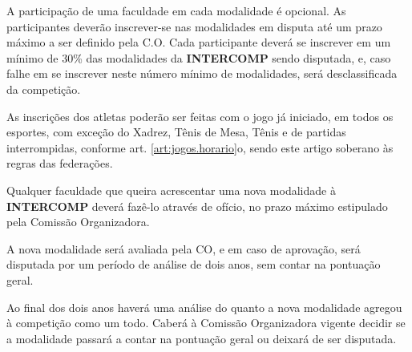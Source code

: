 \begin{article}
	A participação de uma faculdade em cada modalidade é opcional. As participantes deverão inscrever-se nas modalidades em disputa até um prazo máximo a ser definido pela C.O. Cada participante deverá se inscrever em um mínimo de 30\% das modalidades da \textbf{INTERCOMP} sendo disputada, e, caso falhe em se inscrever neste número mínimo de modalidades, será desclassificada da competição.
\end{article}

\begin{article}
	As inscrições dos atletas poderão ser feitas com o jogo já iniciado, em todos os esportes, com exceção do Xadrez, Tênis de Mesa, Tênis e de partidas interrompidas, conforme art. \ref{art:jogos.horario}o, sendo este artigo soberano às regras das federações.
\end{article}

\begin{article}
	Qualquer faculdade que queira acrescentar uma nova modalidade à \textbf{INTERCOMP} deverá fazê-lo através de ofício, no prazo máximo estipulado pela Comissão Organizadora.

	\begin{xparagraph}
		A nova modalidade será avaliada pela CO, e em caso de aprovação, será disputada por um período de análise de dois anos, sem contar na pontuação geral.
	\end{xparagraph}

	\begin{xparagraph}
		Ao final dos dois anos haverá uma análise do quanto a nova modalidade agregou à competição como um todo. Caberá à Comissão Organizadora vigente decidir se a modalidade passará a contar na pontuação geral ou deixará de ser disputada.
	\end{xparagraph}
\end{article}
